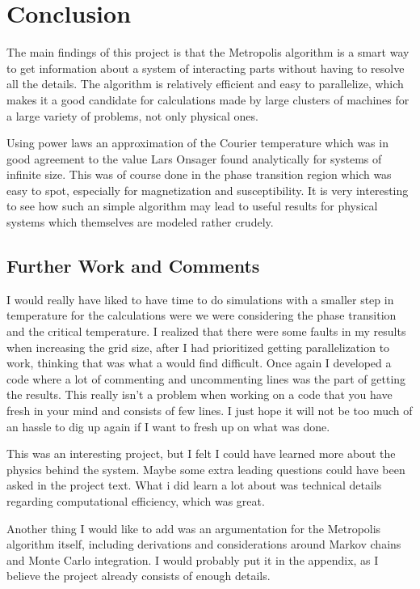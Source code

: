 \documentclass[11pt, a4paper]{article}
\begin{document}
\clearpage
\section{Conclusion}
The main findings of this project is that the Metropolis algorithm is a smart way to get information about a system of interacting parts without having to resolve all the details. The algorithm is relatively efficient and easy to parallelize, which makes it a good candidate for calculations made by large clusters of machines for a large variety of problems, not only physical ones.  

Using power laws an approximation of the Courier temperature which was in good agreement to the value Lars Onsager found analytically for systems of infinite size. This was of course done in the phase transition region which was easy to spot, especially for magnetization and susceptibility. It is very interesting to see how such an simple algorithm may lead to useful results for physical systems which themselves are modeled rather crudely.

\subsection{Further Work and Comments}
I would really have liked to have time to do simulations with a smaller step in temperature for the calculations were we were considering the phase transition and the critical temperature. I realized that there were some faults in my results when increasing the grid size, after I had prioritized getting parallelization to work, thinking that was what a would find difficult. Once again I developed a code where a lot of commenting and uncommenting lines was the part of getting the results. This really isn't a problem when working on a code that you have fresh in your mind and consists of few lines. I just hope it will not be too much of an hassle to dig up again if I want to fresh up on what was done.

This was an interesting project, but I felt I could have learned more about the physics behind the system. Maybe some extra leading questions could have been asked in the project text. What i did learn a lot about was technical details regarding computational efficiency, which was great.

Another thing I would like to add was an argumentation for the Metropolis algorithm itself, including derivations and considerations around Markov chains and Monte Carlo integration. I would probably put it in the appendix, as I believe the project already consists of enough details.
\appendix
\end{document}
